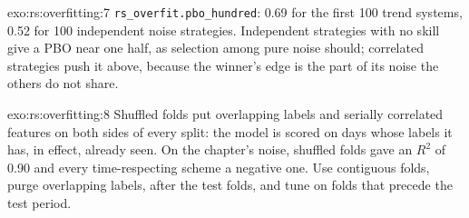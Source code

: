\begin{solution}{exo:rs:overfitting:7}
\texttt{rs\_overfit.pbo\_hundred}: 0.69 for the first 100 trend systems, 0.52 for 100 independent noise strategies. Independent strategies with no skill give a
PBO near one half, as selection among pure noise should; correlated strategies push it above, because the winner's edge is the part of its noise the others
do not share.
\end{solution}

\begin{solution}{exo:rs:overfitting:8}
Shuffled folds put overlapping labels and serially correlated features on both sides of every split: the model is scored on days whose labels it has, in
effect, already seen. On the chapter's noise, shuffled folds gave an $R^2$ of 0.90 and every time-respecting scheme a negative one. Use contiguous folds,
purge overlapping labels,  after the test folds, and tune on folds that precede the test period.
\end{solution}

